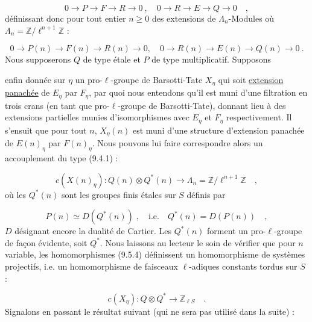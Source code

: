 \begin{equation}\tag{9.5.2}
0 \longrightarrow P \longrightarrow F \longrightarrow R \longrightarrow 0 \ , \quad 0 \longrightarrow R \longrightarrow E \longrightarrow Q \longrightarrow 0 \quad ,
\end{equation}
définissant donc pour tout entier $n \geq 0$ des extensions de $\Lambda_n$-Modules où $\Lambda_n = \mathbb{Z}/\ell^{n+1}\mathbb{Z}$ :

\begin{equation}\tag{9.5.3}
0 \longrightarrow P(n) \longrightarrow F(n) \longrightarrow R(n) \longrightarrow 0, \quad 0 \longrightarrow R(n) \longrightarrow E(n) \longrightarrow Q(n) \longrightarrow 0 \ .
\end{equation}
Nous supposerons $Q$ de type étale et $P$ de type multiplicatif. Supposons



enfin donnée sur $\eta$ un pro-$\ell$-groupe de Barsotti-Tate $X_\eta$ qui soit \underline{extension panachée} de $E_\eta$ par $F_\eta$, par quoi nous entendons qu'il est muni d'une filtration en trois crans (en tant que pro-$\ell$-groupe de Barsotti-Tate), donnant lieu à des extensions partielles munies d'isomorphismes avec $E_\eta$ et $F_\eta$ respectivement. Il s'ensuit que pour tout $n$, $X_\eta(n)$ est muni d'une structure d'extension panachée de $E(n)_\eta$ par $F(n)_\eta$. Nous pouvons lui faire correspondre alors un accouplement du type (9.4.1) :

\begin{equation}\tag{9.5.4}
c(X(n)_\eta) : Q(n) \otimes Q^*(n) \longrightarrow \Lambda_n = \mathbb{Z}/\ell^{n+1}\mathbb{Z} \quad ,
\end{equation}
où les $Q^*(n)$ sont les groupes finis étales sur $S$ définis par

\begin{equation*}
P(n) \simeq D(Q^*(n)) \; , \quad \mathrm{i.e.} \quad Q^*(n) = D(P(n)) \quad ,
\end{equation*}
$D$ désignant encore la dualité de Cartier. Les $Q^*(n)$ forment un pro-$\ell$-groupe de façon évidente, soit $Q^*$. Nous laissons au lecteur le soin de vérifier que pour $n$ variable, les homomorphismes (9.5.4) définissent un homomorphisme de systèmes projectifs, i.e. un homomorphisme de faisceaux $\ell$-adiques constants tordus sur $S$ :

\begin{equation}\tag{9.5.5}
c(X_\eta) : Q \otimes Q^* \longrightarrow \mathbb{Z}_{\ell S} \quad .
\end{equation}
Signalons en passant le résultat suivant (qui ne sera pas utilisé dans la suite) :


